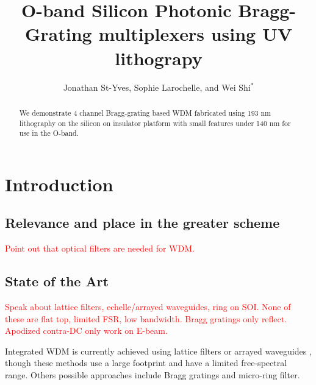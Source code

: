 \documentclass[letterpaper,10pt]{article}
\newcommand\todo[1]{\textcolor{red}{#1}}
\begin{document}
\title{O-band Silicon Photonic Bragg-Grating multiplexers using UV lithograpy}



\author{Jonathan St-Yves, Sophie Larochelle, and Wei Shi$^*$}
\address{Centre d'optique, photonique et laser (COPL) and Département de génie électrique, Université Laval, 2375 rue de la Terrasse, Québec (Québec), Canada, G1V 0A6}



\begin{abstract}
We demonstrate 4 channel Bragg-grating based WDM fabricated using 193 nm lithography on the silicon on insulator platform with small features under 140 nm for use in the O-band.
\end{abstract}



\maketitle


\section{Introduction}
\subsection{Relevance and place in the greater scheme}
\todo{Point out that optical filters are needed for WDM. }

\subsection{State of the Art}
\todo{Speak about lattice filters, echelle/arrayed waveguides, ring on SOI. None of these are flat top, limited FSR, low bandwidth. Bragg gratings only reflect. Apodized contra-DC only work on E-beam.}

Integrated WDM is currently achieved using lattice filters\cite{horst2013cascaded} or arrayed waveguides \cite{okamoto2013fabrication}, though these methods use a large footprint and have a limited free-spectral range. Others possible approaches include Bragg gratings\cite{simard2012apodized} and micro-ring filter\cite{xu2006cascaded}.
\end{document}
